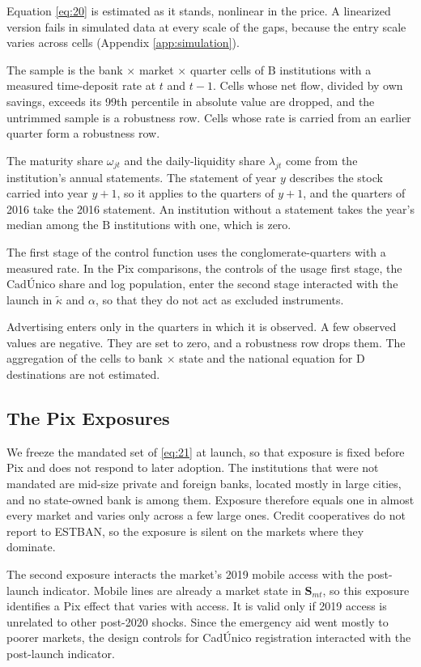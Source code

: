 Equation \eqref{eq:20} is estimated as it stands, nonlinear in the price. A linearized version fails in simulated data at every scale of the gaps, because the entry scale varies across cells (Appendix \ref{app:simulation}).

The sample is the bank $\times$ market $\times$ quarter cells of $\mathrm{B}$ institutions with a measured time-deposit rate at $t$ and $t-1$. Cells whose net flow, divided by own savings, exceeds its 99th percentile in absolute value are dropped, and the untrimmed sample is a robustness row. Cells whose rate is carried from an earlier quarter form a robustness row.

The maturity share $\omega_{jt}$ and the daily-liquidity share $\lambda_{jt}$ come from the institution's annual statements. The statement of year $y$ describes the stock carried into year $y+1$, so it applies to the quarters of $y+1$, and the quarters of 2016 take the 2016 statement. An institution without a statement takes the year's median among the $\mathrm{B}$ institutions with one, which is zero.

The first stage of the control function uses the conglomerate-quarters with a measured rate. In the Pix comparisons, the controls of the usage first stage, the Cad\'{U}nico share and log population, enter the second stage interacted with the launch in $\tilde{\kappa}$ and $\alpha$, so that they do not act as excluded instruments.

Advertising enters only in the quarters in which it is observed. A few observed values are negative. They are set to zero, and a robustness row drops them. The aggregation of the cells to bank $\times$ state and the national equation for $\mathrm{D}$ destinations are not estimated.

\subsection{The Pix Exposures}\label{app:netflow:pix}

We freeze the mandated set of \eqref{eq:21} at launch, so that exposure is fixed before Pix and does not respond to later adoption. The institutions that were not mandated are mid-size private and foreign banks, located mostly in large cities, and no state-owned bank is among them. Exposure therefore equals one in almost every market and varies only across a few large ones. Credit cooperatives do not report to ESTBAN, so the exposure is silent on the markets where they dominate.

The second exposure interacts the market's 2019 mobile access with the post-launch indicator. Mobile lines are already a market state in $\boldsymbol{S}_{mt}$, so this exposure identifies a Pix effect that varies with access. It is valid only if 2019 access is unrelated to other post-2020 shocks. Since the emergency aid went mostly to poorer markets, the design controls for Cad\'{U}nico registration interacted with the post-launch indicator.

